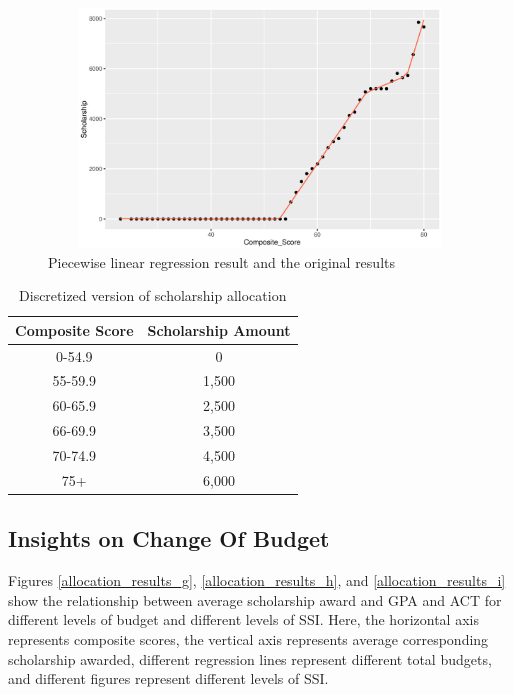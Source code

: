 \documentclass[12pt,english]{report}
\begin{document}
\begin{figure}[ht]
   \centering
 \includegraphics[width=6in, height=2.5in]{pic/PieceWiseRegression.eps}
 \caption{Piecewise linear regression result and the original results}
 \label{PieceWisePolicy}
\end{figure}

\begin{table}[H]
\centering
\begin{tabular}{|c|c|} \hline
Composite Score & Scholarship Amount \\ \hline
0-54.9         & 0              \\ \hline
55-59.9         & 1,500              \\ \hline
60-65.9         & 2,500              \\ \hline
66-69.9         & 3,500              \\ \hline
70-74.9         & 4,500              \\ \hline
75+             & 6,000              \\ \hline
\end{tabular}
\caption{Discretized version of scholarship allocation}
\label{money_result_discrete}

\end{table}

\subsection{Insights on Change Of Budget}
Figures \ref{allocation_results_g}, \ref{allocation_results_h}, and \ref{allocation_results_i} show the relationship between average scholarship award and GPA and ACT for different levels of budget and different levels of SSI. Here, the horizontal axis represents composite scores, the vertical axis represents average corresponding scholarship awarded, different regression lines represent different total budgets, and different figures represent different levels of SSI.
\end{document}
